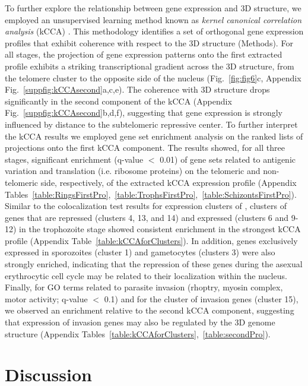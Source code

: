 To further explore the relationship between gene expression and 3D structure,
we employed an unsupervised learning method known as {\em kernel canonical
correlation analysis} (kCCA) \citep{bach:kernel}. This methodology identifies
a set of orthogonal gene expression profiles that exhibit coherence with
respect to the 3D structure (Methods). For all stages, the projection of gene
expression patterns onto the first extracted profile exhibits a striking
transcriptional gradient across the 3D structure, from the telomere cluster to
the opposite side of the nucleus  (Fig.~\ref{fig:fig6}c, Appendix
Fig.~\ref{suppfig:kCCAsecond}a,c,e). The coherence with 3D structure drops
significantly in the second component of the kCCA (Appendix
Fig.~\ref{suppfig:kCCAsecond}b,d,f), suggesting that gene expression is
strongly influenced by distance to the subtelomeric repressive center. To
further interpret the kCCA results we employed gene set enrichment analysis
\citep{subramanian:gene} on the ranked lists of projections onto the first
kCCA component. The results showed, for all three stages, significant
enrichment (q-value $<$ 0.01) of gene sets related to antigenic variation and
translation (i.e. ribosome proteins) on the telomeric and non-telomeric side,
respectively, of the extracted kCCA expression profile (Appendix
Tables~\ref{table:RingsFirstPro},~\ref{table:TrophsFirstPro},~\ref{table:SchizontsFirstPro}).
Similar to the colocalization test results for expression clusters of
\cite{leroch:discovery}, clusters of genes that are repressed (clusters 4, 13,
and 14) and expressed (clusters 6 and 9-12) in the trophozoite stage showed
consistent enrichment in the strongest kCCA profile (Appendix
Table~\ref{table:kCCAforClusters}). In addition, genes exclusively expressed
in sporozoites (cluster 1) and gametocytes (clusters 3) were also strongly
enriched, indicating that the repression of these genes during the asexual
erythrocytic cell cycle may be related to their localization within the
nucleus. Finally, for GO terms related to parasite invasion (rhoptry, myosin
complex, motor activity; q-value $<$ 0.1) and for the cluster of invasion
genes (cluster 15), we observed an enrichment relative to the second kCCA
component, suggesting that expression of invasion genes may also be regulated
by the 3D genome structure (Appendix
Tables~\ref{table:kCCAforClusters},~\ref{table:secondPro}).


\section{Discussion}

